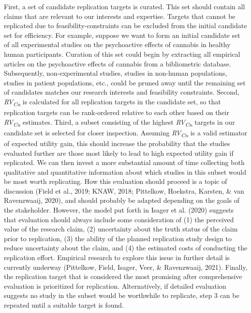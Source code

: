 \documentclass[
  english,
  jou,floatsintext]{apa6}
\begin{document}
First, a set of candidate replication targets is curated. This set should contain all claims that are relevant to our interests and expertise. Targets that cannot be replicated due to feasibility-constraints can be excluded from the initial candidate set for efficiency. For example, suppose we want to form an initial candidate set of all experimental studies on the psychoactive effects of cannabis in healthy human participants. Curation of this set could begin by extracting all empirical articles on the psychoactive effects of cannabis from a bibliometric database. Subsequently, non-experimental studies, studies in non-human populations, studies in patient populations, etc., could be pruned away until the remaining set of candidates matches our research interests and feasibility constraints. Second, \emph{RV\textsubscript{Cn}} is calculated for all replication targets in the candidate set, so that replication targets can be rank-ordered relative to each other based on their \emph{RV\textsubscript{Cn}} estimates. Third, a subset consisting of the highest \emph{RV\textsubscript{Cn}} targets in our candidate set is selected for closer inspection. Assuming \emph{RV\textsubscript{Cn}} is a valid estimator of expected utility gain, this should increase the probability that the studies evaluated further are those most likely to lead to high expected utility gain if replicated. We can then invest a more substantial amount of time collecting both qualitative and quantitative information about which studies in this subset would be most worth replicating. How this evaluation should proceed is a topic of discussion (Field et al., 2019; KNAW, 2018; Pittelkow, Hoekstra, Karsten, \& van Ravenzwaaij, 2020), and should probably be adapted depending on the goals of the stakeholder. However, the model put forth in Isager et al. (2020) suggests that evaluation should always include some consideration of (1) the perceived value of the research claim, (2) uncertainty about the truth status of the claim prior to replication, (3) the ability of the planned replication study design to reduce uncertainty about the claim, and (4) the estimated costs of conducting the replication effort. Empirical research to explore this issue in further detail is currently underway (Pittelkow, Field, Isager, Veer, \& Ravenzwaaij, 2021). Finally, the replication target that is considered the most promising after comprehensive evaluation is prioritized for replication. Alternatively, if detailed evaluation suggests no study in the subset would be worthwhile to replicate, step 3 can be repeated until a suitable target is found.
\end{document}

